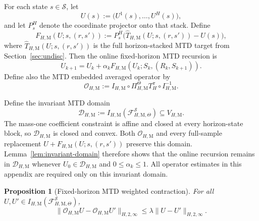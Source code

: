 \documentclass{article}
\newtheorem{proposition}[theorem]{Proposition}
\newcommand{\X}{\mathcal{S}}
\begin{document}
For each state $s\in \X$, let
\begin{equation}
U(s):=\bigl(U^1(s),\dots,U^H(s)\bigr),
\end{equation}
and let $P_s^H$ denote the coordinate projector onto that stack. Define
\begin{equation}
F_{H,\mathrm M}(U;s,(r,s')) := P_s^H\bigl(\widehat T_{H,\mathrm M}(U;s,(r,s'))-U(s)\bigr),
\end{equation}
where $\widehat T_{H,\mathrm M}(U;s,(r,s'))$ is the full horizon-stacked MTD target from Section~\ref{sec:undisc}. Then the online fixed-horizon MTD recursion is
\begin{equation}
U_{k+1}=U_k+\alpha_k F_{H,\mathrm M}(U_k;S_k,(R_k,S_{k+1})).
\end{equation}
Define also the MTD embedded averaged operator by
\begin{equation}
\mathcal O_{H,\mathrm M} := I_{H,\mathrm M}\circ \Pi_{H,\mathrm M}^{\Theta} T_H^\pi \circ I_{H,\mathrm M}^{-1}.
\end{equation}

Define the invariant MTD domain
\begin{equation}
\mathcal D_{H,\mathrm M}:=I_{H,\mathrm M}(\mathcal F_{H,\mathrm M,\Theta}^{\X})\subseteq V_{H,\mathrm M}.
\end{equation}
The mass-one coefficient constraint is affine and closed at every horizon-state block, so $\mathcal D_{H,\mathrm M}$ is closed and convex. Both $\mathcal O_{H,\mathrm M}$ and every full-sample replacement $U+F_{H,\mathrm M}(U;s,(r,s'))$ preserve this domain. Lemma~\ref{lem:invariant-domain} therefore shows that the online recursion remains in $\mathcal D_{H,\mathrm M}$ whenever $U_0\in\mathcal D_{H,\mathrm M}$ and $0\le\alpha_k\le1$. All operator estimates in this appendix are required only on this invariant domain.

\begin{proposition}[Fixed-horizon MTD weighted contraction]
\label{prop:fh-mtd-contract-app}
For all $U,U' \in I_{H,\mathrm M}(\mathcal F_{H,\mathrm M,\Theta}^\X)$,
\begin{equation}
\lVert \mathcal O_{H,\mathrm M}U-\mathcal O_{H,\mathrm M}U'\rVert_{H,2,\infty} \le \lambda \lVert U-U'\rVert_{H,2,\infty}.
\end{equation}
\end{proposition}
\end{document}
